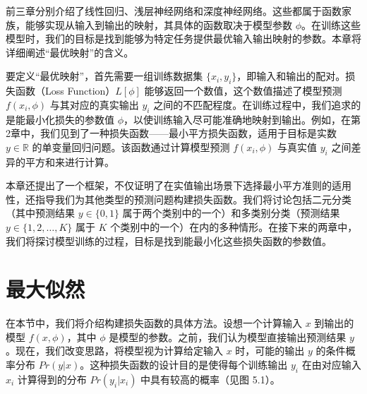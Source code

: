 \documentclass[lang=cn,newtx,10pt,scheme=chinese]{elegantbook}
\begin{document}
前三章分别介绍了线性回归、浅层神经网络和深度神经网络。这些都属于函数家族，能够实现从输入到输出的映射，其具体的函数取决于模型参数 \(\phi\)。在训练这些模型时，我们的目标是找到能够为特定任务提供最优输入输出映射的参数。本章将详细阐述“最优映射”的含义。

要定义“最优映射”，首先需要一组训练数据集 \(\{x_i, y_i\}\)，即输入和输出的配对。损失函数（Loss Function）\(L[\phi]\) 能够返回一个数值，这个数值描述了模型预测 \(f(x_i, \phi)\) 与其对应的真实输出 \(y_i\) 之间的不匹配程度。在训练过程中，我们追求的是能最小化损失的参数值 \(\phi\)，以使训练输入尽可能准确地映射到输出。例如，在第2章中，我们见到了一种损失函数——最小平方损失函数，适用于目标是实数 \(y \in \mathbb{R}\) 的单变量回归问题。该函数通过计算模型预测 \(f(x_i, \phi)\) 与真实值 \(y_i\) 之间差异的平方和来进行计算。

本章还提出了一个框架，不仅证明了在实值输出场景下选择最小平方准则的适用性，还指导我们为其他类型的预测问题构建损失函数。我们将讨论包括二元分类（其中预测结果 \(y \in \{0, 1\}\) 属于两个类别中的一个）和多类别分类（预测结果 \(y \in \{1, 2, \ldots, K\}\) 属于 \(K\) 个类别中的一个）在内的多种情形。在接下来的两章中，我们将探讨模型训练的过程，目标是找到能最小化这些损失函数的参数值。

\section{最大似然}
在本节中，我们将介绍构建损失函数的具体方法。设想一个计算输入 \(x\) 到输出的模型 \(f(x, \phi)\)，其中 \(\phi\) 是模型的参数。之前，我们认为模型直接输出预测结果 \(y\)。现在，我们改变思路，将模型视为计算给定输入 \(x\) 时，可能的输出 \(y\) 的条件概率分布 \(Pr(y|x)\)。这种损失函数的设计目的是使得每个训练输出 \(y_i\) 在由对应输入 \(x_i\) 计算得到的分布 \(Pr(y_i|x_i)\) 中具有较高的概率（见图 5.1）。
\end{document}
